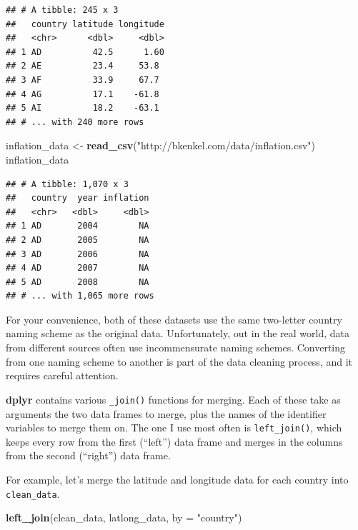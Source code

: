\documentclass[
  12pt,
  oneside,openany]{book}
\newenvironment{Shaded}{\begin{snugshade}}{\end{snugshade}}
\newcommand{\DataTypeTok}[1]{\textcolor[rgb]{0.13,0.29,0.53}{#1}}
\newcommand{\KeywordTok}[1]{\textcolor[rgb]{0.13,0.29,0.53}{\textbf{#1}}}
\newcommand{\NormalTok}[1]{#1}
\newcommand{\StringTok}[1]{\textcolor[rgb]{0.31,0.60,0.02}{#1}}
\begin{document}
\begin{verbatim}
## # A tibble: 245 x 3
##   country latitude longitude
##   <chr>      <dbl>     <dbl>
## 1 AD          42.5      1.60
## 2 AE          23.4     53.8 
## 3 AF          33.9     67.7 
## 4 AG          17.1    -61.8 
## 5 AI          18.2    -63.1 
## # ... with 240 more rows
\end{verbatim}

\begin{Shaded}
\begin{Highlighting}[]
\NormalTok{inflation\_data <{-}}\StringTok{ }\KeywordTok{read\_csv}\NormalTok{(}\StringTok{"http://bkenkel.com/data/inflation.csv"}\NormalTok{)}
\NormalTok{inflation\_data}
\end{Highlighting}
\end{Shaded}

\begin{verbatim}
## # A tibble: 1,070 x 3
##   country  year inflation
##   <chr>   <dbl>     <dbl>
## 1 AD       2004        NA
## 2 AD       2005        NA
## 3 AD       2006        NA
## 4 AD       2007        NA
## 5 AD       2008        NA
## # ... with 1,065 more rows
\end{verbatim}

For your convenience, both of these datasets use the same two-letter country naming scheme as the original data. Unfortunately, out in the real world, data from different sources often use incommensurate naming schemes. Converting from one naming scheme to another is part of the data cleaning process, and it requires careful attention.

\textbf{dplyr} contains various \texttt{\_join()} functions for merging. Each of these take as arguments the two data frames to merge, plus the names of the identifier variables to merge them on. The one I use most often is \texttt{left\_join()}, which keeps every row from the first (``left'') data frame and merges in the columns from the second (``right'') data frame.

For example, let's merge the latitude and longitude data for each country into \texttt{clean\_data}.

\begin{Shaded}
\begin{Highlighting}[]
\KeywordTok{left\_join}\NormalTok{(clean\_data,}
\NormalTok{          latlong\_data,}
          \DataTypeTok{by =} \StringTok{"country"}\NormalTok{)}
\end{Highlighting}
\end{Shaded}
\end{document}
